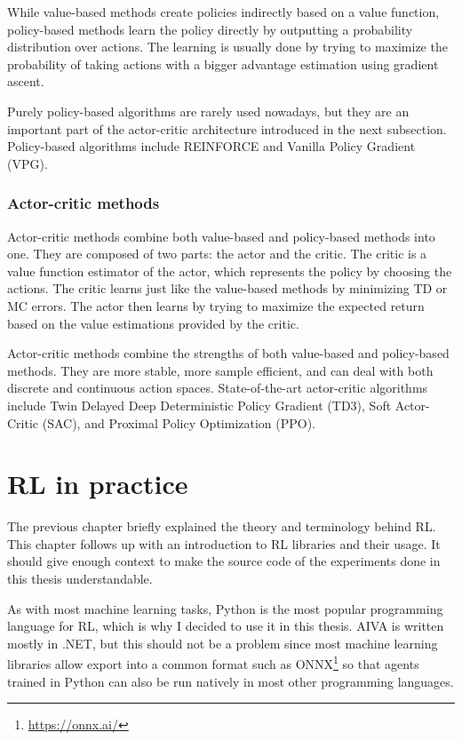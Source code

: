 \documentclass[
  digital,     %
  oneside,     %
  nosansbold,  %
  nocolorbold, %
  lof,         %
  lot,         %
]{fithesis4}
\begin{document}
While value-based methods create policies indirectly based on a value function, policy-based methods learn the policy directly by outputting a probability distribution over actions. The learning is usually done by trying to maximize the probability of taking actions with a bigger advantage estimation using gradient ascent.

Purely policy-based algorithms are rarely used nowadays, but they are an important part of the actor-critic architecture introduced in the next subsection. Policy-based algorithms include REINFORCE and Vanilla Policy Gradient (VPG).

\subsection{Actor-critic methods}

Actor-critic methods combine both value-based and policy-based methods into one. They are composed of two parts: the actor and the critic. The critic is a value function estimator of the actor, which represents the policy by choosing the actions. The critic learns just like the value-based methods by minimizing TD or MC errors. The actor then learns by trying to maximize the expected return based on the value estimations provided by the critic.

Actor-critic methods combine the strengths of both value-based and policy-based methods. They are more stable, more sample efficient, and can deal with both discrete and continuous action spaces. State-of-the-art actor-critic algorithms include Twin Delayed Deep Deterministic Policy Gradient (TD3), Soft Actor-Critic (SAC), and Proximal Policy Optimization (PPO).

\chapter{RL in practice}

The previous chapter briefly explained the theory and terminology behind RL. This chapter follows up with an introduction to RL libraries and their usage. It should give enough context to make the source code of the experiments done in this thesis understandable.

As with most machine learning tasks, Python is the most popular programming language for RL, which is why I decided to use it in this thesis. AIVA is written mostly in .NET, but this should not be a problem since most machine learning libraries allow export into a common format such as ONNX\footnote{\url{https://onnx.ai/}} so that agents trained in Python can also be run natively in most other programming languages.
\end{document}
